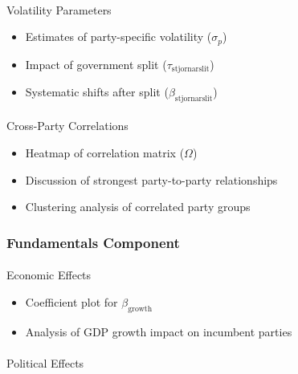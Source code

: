 \documentclass[
  letterpaper,
  DIV=11,
  numbers=noendperiod]{scrartcl}
\makeatletter
\let\oldparagraph\paragraph
\renewcommand{\paragraph}{
    \@ifstar
      \xxxParagraphStar
      \xxxParagraphNoStar
  }
\newcommand{\xxxParagraphStar}[1]{\oldparagraph*{#1}\mbox{}}
\newcommand{\xxxParagraphNoStar}[1]{\oldparagraph{#1}\mbox{}}
\providecommand{\tightlist}{%
  \setlength{\itemsep}{0pt}\setlength{\parskip}{0pt}}\usepackage{longtable,booktabs,array}
\makeatother
\begin{document}
\paragraph{Volatility Parameters}\label{volatility-parameters}

\begin{itemize}
\tightlist
\item
  Estimates of party-specific volatility (\(\sigma_p\))
\item
  Impact of government split (\(\tau_\text{stjornarslit}\))
\item
  Systematic shifts after split (\(\beta_\text{stjornarslit}\))
\end{itemize}

\paragraph{Cross-Party Correlations}\label{cross-party-correlations}

\begin{itemize}
\tightlist
\item
  Heatmap of correlation matrix (\(\Omega\))
\item
  Discussion of strongest party-to-party relationships
\item
  Clustering analysis of correlated party groups
\end{itemize}

\subsubsection{Fundamentals Component}\label{fundamentals-component-1}

\paragraph{Economic Effects}\label{economic-effects}

\begin{itemize}
\tightlist
\item
  Coefficient plot for \(\beta_\text{growth}\)
\item
  Analysis of GDP growth impact on incumbent parties
\end{itemize}

\paragraph{Political Effects}\label{political-effects}
\end{document}
